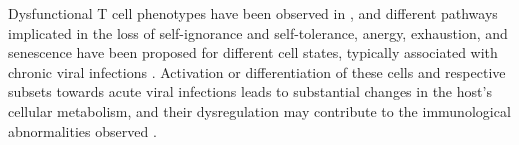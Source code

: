 Dysfunctional T cell phenotypes have been observed in \cfs, and different pathways implicated in the loss of self-ignorance and self-tolerance, anergy, exhaustion, and senescence have been proposed for different cell states, typically associated with chronic viral infections \citep{maya2023SurveyingMetabolic}.%
Activation or differentiation of these cells and respective subsets towards acute viral infections leads to substantial changes in the host's cellular metabolism, and their dysregulation may contribute to the immunological abnormalities observed \citep{bantug2018SpectrumCell}.
 
% 

